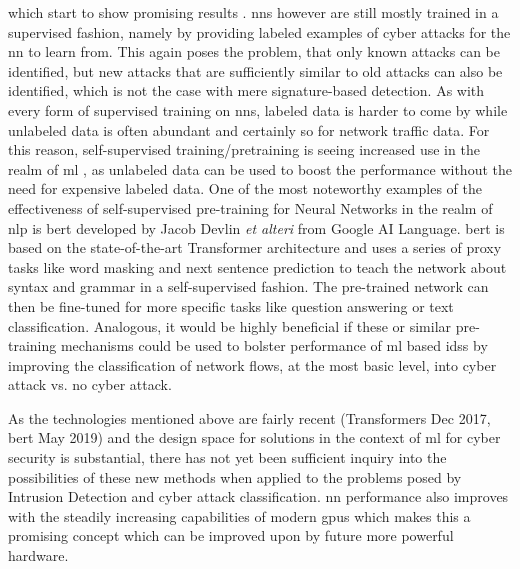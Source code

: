 which start to show promising results . \glspl{nn} however are still mostly trained in a supervised fashion, namely by providing labeled examples of cyber attacks for the \gls{nn} to learn from. This again poses the problem, that only known attacks can be identified, but new attacks that are sufficiently similar to old attacks can also be identified, which is not the case with mere signature-based detection. As with every form of supervised training on \glspl{nn}, labeled data is harder to come by while unlabeled data is often abundant and certainly so for network traffic data. For this reason, self-supervised training/pretraining is seeing increased use in the realm of \gls{ml} , as unlabeled data can be used to boost the performance without the need for expensive labeled data. One of the most noteworthy examples of the effectiveness of self-supervised pre-training for Neural Networks in the realm of \gls{nlp} is \gls{bert} \cite{bert} developed by Jacob Devlin \textit{et alteri} from Google AI Language. \gls{bert} is based on the state-of-the-art Transformer architecture \cite{attention} and uses a series of proxy tasks like word masking and next sentence prediction to teach the network about syntax and grammar in a self-supervised fashion. The pre-trained network can then be fine-tuned for more specific tasks like question answering or text classification. Analogous, it would be highly beneficial if these or similar pre-training mechanisms could be used to bolster performance of \gls{ml} based \glspl{ids} by improving the classification of network flows, at the most basic level, into cyber attack vs. no cyber attack. \par
As the technologies mentioned above are fairly recent (Transformers Dec 2017, \gls{bert} May 2019) and the design space for solutions in the context of \gls{ml} for cyber security is substantial, there has not yet been sufficient inquiry into the possibilities of these new methods when applied to the problems posed by Intrusion Detection and cyber attack classification. \gls{nn} performance also improves with the steadily increasing capabilities of modern \glspl{gpu} which makes this a promising concept which can be improved upon by future more powerful hardware. 


